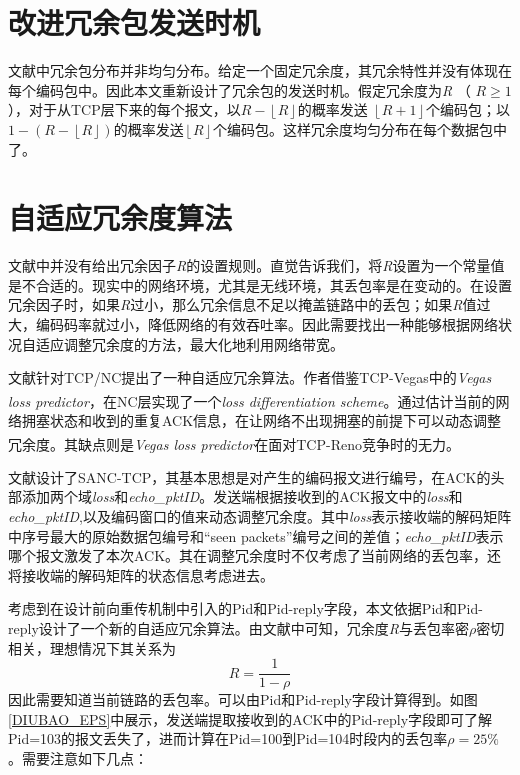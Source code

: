 \section{改进冗余包发送时机}
文献\cite{Sundararajan2009}中冗余包分布并非均匀分布。给定一个固定冗余度，其冗余特性并没有体现在每个编码包中。因此本文重新设计了冗余包的发送时机。假定冗余度为\emph{R} （ $R \ge 1$ ），对于从TCP层下来的每个报文，以$R - \left\lfloor R \right\rfloor$的概率发送 $\left\lfloor R+1 \right\rfloor$个编码包；以$1-\left(R-\left\lfloor R \right\rfloor\right)$的概率发送$\left\lfloor R \right\rfloor$个编码包。这样冗余度均匀分布在每个数据包中了。
\section{自适应冗余度算法}
文献\cite{Sundararajan2009}中并没有给出冗余因子\emph{R}的设置规则。直觉告诉我们，将\emph{R}设置为一个常量值是不合适的。现实中的网络环境，尤其是无线环境，其丢包率是在变动的。在设置冗余因子时，如果\emph{R}过小，那么冗余信息不足以掩盖链路中的丢包；如果\emph{R}值过大，编码码率就过小，降低网络的有效吞吐率。因此需要找出一种能够根据网络状况自适应调整冗余度的方法，最大化地利用网络带宽。
\par
文献\cite{6261883}针对TCP/NC提出了一种自适应冗余算法。作者借鉴TCP-Vegas中的\emph{Vegas loss predictor}\textsuperscript{\cite{martignon2004loss,brakmo1995tcp}}，在NC层实现了一个\emph{loss differentiation scheme}。通过估计当前的网络拥塞状态和收到的重复ACK信息，在让网络不出现拥塞的前提下可以动态调整冗余度。其缺点则是\emph{Vegas loss predictor}在面对TCP-Reno竞争时的无力\textsuperscript{\cite{hasegawa2000fairness}}。
\par
文献\cite{song2011self}设计了SANC-TCP，其基本思想是对产生的编码报文进行编号，在ACK的头部添加两个域\emph{loss}和\emph{echo\_pktID}。发送端根据接收到的ACK报文中的\emph{loss}和\emph{echo\_pktID},以及编码窗口的值来动态调整冗余度。其中\emph{loss}表示接收端的解码矩阵中序号最大的原始数据包编号和“seen packets”编号之间的差值；\emph{echo\_pktID}表示哪个报文激发了本次ACK。其在调整冗余度时不仅考虑了当前网络的丢包率，还将接收端的解码矩阵的状态信息考虑进去。
\par
考虑到在设计前向重传机制中引入的Pid和Pid-reply字段，本文依据Pid和Pid-reply设计了一个新的自适应冗余算法。由文献\cite{Sundararajan2011}中可知，冗余度\emph{R}与丢包率密$\rho$密切相关，理想情况下其关系为
\begin{equation}
	R=\dfrac{1}{1-\rho}
\end{equation}
因此需要知道当前链路的丢包率。可以由Pid和Pid-reply字段计算得到。如图\ref{DIUBAO_EPS}中展示，发送端提取接收到的ACK中的Pid-reply字段即可了解Pid=103的报文丢失了，进而计算在Pid=100到Pid=104时段内的丢包率$\rho=25\%$。需要注意如下几点：
